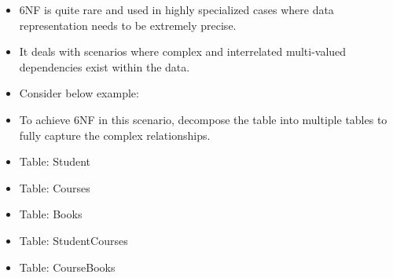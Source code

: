 \setlength{\columnsep}{3pt}
\begin{flushleft}
	
	\begin{itemize}
		\item 6NF is quite rare and used in highly specialized cases where data representation needs to be extremely precise. 
		\item It deals with scenarios where complex and interrelated multi-valued dependencies exist within the data. 
		\item Consider below example:
		
		\item To achieve 6NF in this scenario, decompose the table into multiple tables to fully capture the complex relationships.
		
		\newpage
		\item Table: Student
		
		\item Table: Courses

		\item Table: Books
		\newpage
		\item Table: StudentCourses
		
		\item Table: CourseBooks
		
		
	\end{itemize}	
	
\end{flushleft}

\newpage

